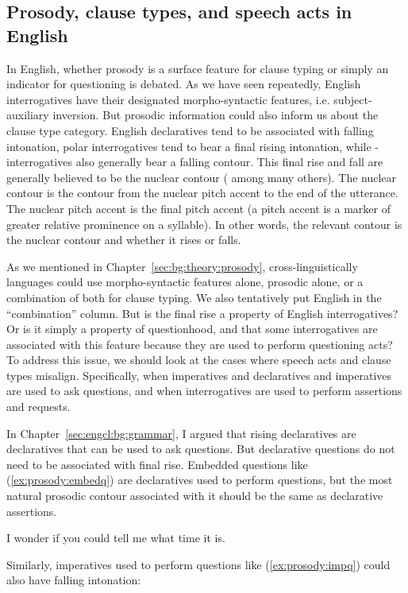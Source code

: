 \subsection{Prosody, clause types, and speech acts in English}
In English, whether prosody is a surface feature for clause typing or simply an indicator for questioning is debated. As we have seen repeatedly, English interrogatives have their designated morpho-syntactic features, i.e. subject-auxiliary inversion. But prosodic information could also inform us about the clause type category. English declaratives tend to be associated with falling intonation, polar interrogatives tend to bear a final rising intonation, while \twh-interrogatives also generally bear a falling contour. This final rise and fall are generally believed to be the nuclear contour (\citealt{ladd1981, ladd2008intonational, hedberg2004wh, hedberg2014corpus} among many others). The nuclear contour is the contour from the nuclear pitch accent to the end of the utterance. The nuclear pitch accent is the final pitch accent (a pitch accent is a marker of greater relative prominence on a syllable). In other words, the relevant contour is the nuclear contour and whether it rises or falls. 


As we mentioned in Chapter~\ref{sec:bg:theory:prosody}, cross-linguistically languages could use morpho-syntactic features alone, prosodic alone, or a combination of both for clause typing. We also tentatively put English in the ``combination'' column. But is the final rise a property of English interrogatives? Or is it simply a property of questionhood, and that some interrogatives are associated with this feature because they are used to perform questioning acts? To address this issue, we should look at the cases where speech acts and clause types misalign. Specifically, when imperatives and declaratives and imperatives are used to ask questions, and when interrogatives are used to perform assertions and requests.

In Chapter~\ref{sec:engcl:bg:grammar}, I argued that rising declaratives are declaratives that can be used to ask questions. But declarative questions do not need to be associated with final rise. Embedded questions like (\ref{ex:prosody:embedq}) are declaratives used to perform questions, but the most natural prosodic contour associated with it should be the same as declarative assertions.

I wonder if you could tell me what time it is.
\eex

Similarly, imperatives used to perform questions like (\ref{ex:prosody:impq}) could also have falling intonation:


